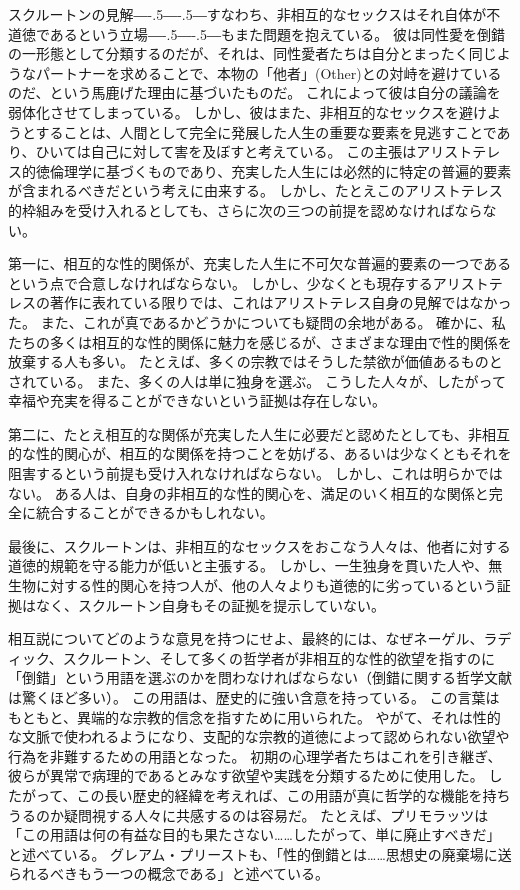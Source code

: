 \documentclass[paper=a4,book,openany]{jlreq}
\def\DDASH{―\kern-.5\zw―\kern-.5\zw―} %
\begin{document}
スクルートンの見解{\DDASH}すなわち、非相互的なセックスはそれ自体が不道徳であるという立場{\DDASH}もまた問題を抱えている。
彼は同性愛を倒錯の一形態として分類するのだが、それは、同性愛者たちは自分とまったく同じようなパートナーを求めることで、本物の「他者」(Other)との対峙を避けているのだ、という馬鹿げた理由に基づいたものだ。
これによって彼は自分の議論を弱体化させてしまっている。
しかし、彼はまた、非相互的なセックスを避けようとすることは、人間として完全に発展した人生の重要な要素を見逃すことであり、ひいては自己に対して害を及ぼすと考えている。
この主張はアリストテレス的徳倫理学に基づくものであり、充実した人生には必然的に特定の普遍的要素が含まれるべきだという考えに由来する。
しかし、たとえこのアリストテレス的枠組みを受け入れるとしても、さらに次の三つの前提を認めなければならない。

第一に、相互的な性的関係が、充実した人生に不可欠な普遍的要素の一つであるという点で合意しなければならない。
しかし、少なくとも現存するアリストテレスの著作に表れている限りでは、これはアリストテレス自身の見解ではなかった。
また、これが真であるかどうかについても疑問の余地がある。
確かに、私たちの多くは相互的な性的関係に魅力を感じるが、さまざまな理由で性的関係を放棄する人も多い。
たとえば、多くの宗教ではそうした禁欲が価値あるものとされている。
また、多くの人は単に独身を選ぶ。
こうした人々が、したがって幸福や充実を得ることができないという証拠は存在しない。

第二に、たとえ相互的な関係が充実した人生に必要だと認めたとしても、非相互的な性的関心が、相互的な関係を持つことを妨げる、あるいは少なくともそれを阻害するという前提も受け入れなければならない。
しかし、これは明らかではない。
ある人は、自身の非相互的な性的関心を、満足のいく相互的な関係と完全に統合することができるかもしれない。

最後に、スクルートンは、非相互的なセックスをおこなう人々は、他者に対する道徳的規範を守る能力が低いと主張する。
しかし、一生独身を貫いた人や、無生物に対する性的関心を持つ人が、他の人々よりも道徳的に劣っているという証拠はなく、スクルートン自身もその証拠を提示していない。

相互説についてどのような意見を持つにせよ、最終的には、なぜネーゲル、ラディック、スクルートン、そして多くの哲学者が非相互的な性的欲望を指すのに「倒錯」という用語を選ぶのかを問わなければならない（倒錯に関する哲学文献は驚くほど多い）。
この用語は、歴史的に強い含意を持っている。
この言葉はもともと、異端的な宗教的信念を指すために用いられた。
やがて、それは性的な文脈で使われるようになり、支配的な宗教的道徳によって認められない欲望や行為を非難するための用語となった。
初期の心理学者たちはこれを引き継ぎ、彼らが異常で病理的であるとみなす欲望や実践を分類するために使用した。
したがって、この長い歴史的経緯を考えれば、この用語が真に哲学的な機能を持ちうるのか疑問視する人々に共感するのは容易だ。
たとえば、プリモラッツは「この用語は何の有益な目的も果たさない……したがって、単に廃止すべきだ」と述べている\citep[p.64]{primoratz99:_ethic_and_sex}。
グレアム・プリーストも、「性的倒錯とは……思想史の廃棄場に送られるべきもう一つの概念である」と述べている\citep[p.371]{priest97:_sexual_perver}。
\end{document}
